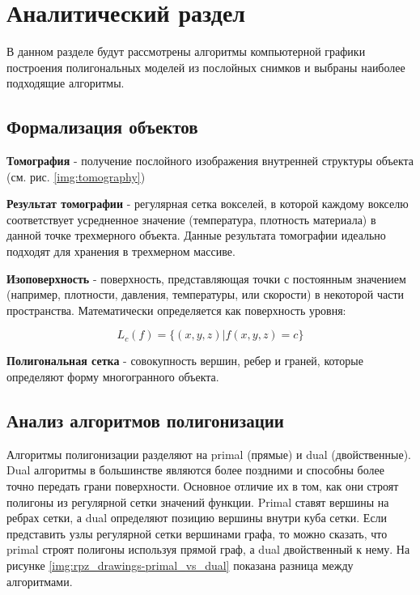 \chapter{Аналитический раздел}

В данном разделе будут рассмотрены алгоритмы компьютерной графики построения полигональных моделей из послойных снимков и выбраны наиболее подходящие алгоритмы.

\section{Формализация объектов}

\textbf{Томография} - получение послойного изображения внутренней структуры объекта (см. рис. \ref{img:tomography})


\textbf{Результат томографии} - регулярная сетка вокселей, в которой каждому вокселю соответствует усредненное значение (температура, плотность материала) в данной точке трехмерного объекта. Данные результата томографии идеально подходят для хранения в трехмерном массиве. 

\textbf{Изоповерхность} - поверхность, представляющая точки с постоянным значением (например, плотности, давления, температуры, или скорости) в некоторой части пространства. Математически определяется как поверхность уровня:

\begin{equation}
    L_c(f) = \{ (x,y,z) | f(x,y,z) = c \}
    \label{eq:isoline}
\end{equation}

\textbf{Полигональная сетка} - совокупность вершин, ребер и граней, которые определяют форму многогранного объекта. 

\section{Анализ алгоритмов полигонизации}

Алгоритмы полигонизации разделяют на primal (прямые) и dual (двойственные). Dual алгоритмы в большинстве являются более поздними и способны более точно передать грани поверхности. Основное отличие их в том, как они строят полигоны из регулярной сетки значений функции. Primal ставят вершины на ребрах сетки, а dual определяют позицию вершины внутри куба сетки. Если представить узлы регулярной сетки вершинами графа, то можно сказать, что primal строят полигоны используя прямой граф, а dual двойственный к нему. На рисунке \ref{img:rpz_drawings-primal_vs_dual} показана разница между алгоритмами.

